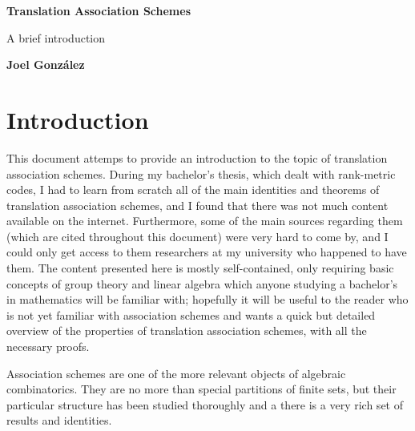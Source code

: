\documentclass[a4paper,12pt]{article}
\theoremstyle{plain}
\theoremstyle{definition}
\theoremstyle{remark}
\begin{document}
\begin{titlepage}
    \begin{center}
        \vspace{1cm}
        \Huge
        \textbf{Translation Association Schemes}

        \vspace{0.5cm}
        \LARGE
        A brief introduction

        \vspace{1.5cm}

       \textbf{Joel González}

       \vfill
    \end{center}
\end{titlepage}

\clearpage
{}

\section{Introduction}

This document attemps to provide an introduction to the topic of translation
association schemes. During my bachelor's thesis, which dealt with rank-metric
codes, I had to learn from scratch all of the main identities and
theorems of translation association schemes, and I found that there was not much
content available on the internet. Furthermore, some of the main sources regarding
them (which are cited throughout this document) were very hard to come by, and
I could only get access to them researchers at my university who happened to have them.
The content presented here is mostly self-contained,
only requiring basic concepts of group theory and linear algebra which anyone
studying a bachelor's in mathematics will be familiar with; hopefully it will
be useful to the reader who is not yet familiar with association schemes and
wants a quick but detailed overview of the properties of translation association
schemes, with all the necessary proofs.

Association schemes are one of the more relevant objects of algebraic combinatorics.
They are no more than special partitions of finite sets, but their particular
structure has been studied thoroughly and a there is a very rich set of results
and identities.
\end{document}

